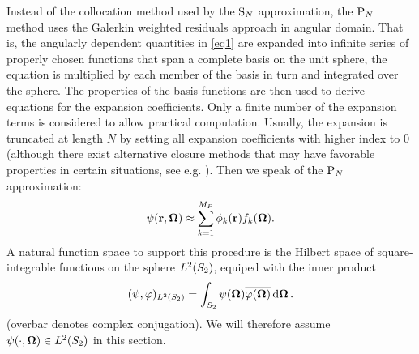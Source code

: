 Instead of the collocation method used by the $\SN$ approximation, the $\PN$ method uses the Galerkin weighted residuals
approach in angular domain. That is, the angularly dependent quantities in \eqref{eq1} are expanded into infinite
series of properly chosen functions that span a complete basis on the unit sphere, the equation is multiplied by each member of the basis in turn
and integrated over the sphere. The properties of the basis functions are then used to derive equations for
the expansion coefficients. Only a finite number of the expansion terms is considered to allow practical computation.
Usually, the expansion is truncated at length $N$ by setting all expansion coefficients with higher index to 0 (although
there exist alternative closure methods that may have favorable properties in certain situations, see e.g.
\cite{Frank0}). Then we speak of the $\PN$ approximation:
\begin{equation}\label{eq1.1}
  \psi(\br,\bomega) \approx \sum_{k=1}^{ M_P} \phi_k(\br) f_k(\bomega).
\end{equation}
A natural function space to support this procedure is the Hilbert space of 
square-integrable functions on the sphere $\Lp[2](\Sphere)$, equiped with the inner product
\begin{equation}\label{eq:s2_ip}
	(\psi, \varphi)_{\Lp[2](\Sphere)} = \intA{\psi(\bomega) \overline{\varphi(\bomega)}}.
\end{equation}
(overbar denotes complex conjugation). 
We will therefore assume $\psi(\cdot,\bomega)\in\Lp[2](\Sphere)$ in this section. 

